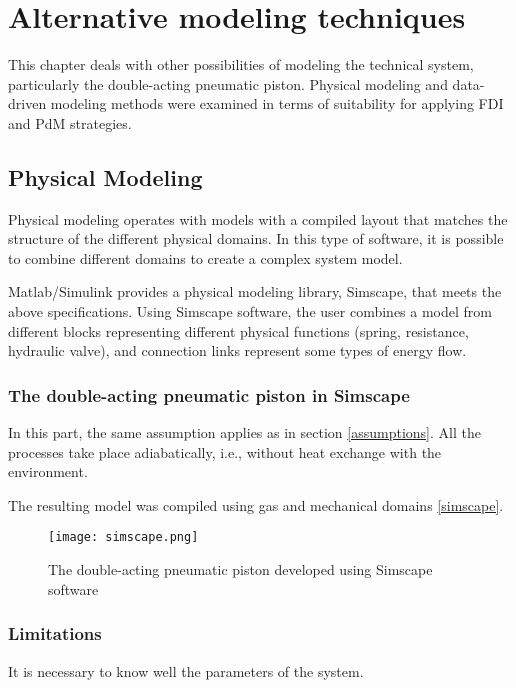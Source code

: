 \chapter{Alternative modeling techniques}

This chapter deals with other possibilities of modeling the technical
system, particularly the double-acting pneumatic piston. Physical modeling
and data-driven modeling methods were examined in terms of suitability for
applying FDI and PdM strategies.

\section{Physical Modeling}
Physical modeling operates with models with a compiled layout that matches
the structure of the different physical domains. In this type of software,
it is possible to combine different domains to create a complex system
model.

Matlab/Simulink provides a physical modeling library, Simscape, that meets
the above specifications. Using Simscape software, the user combines a
model from different blocks representing different physical functions
(spring, resistance, hydraulic valve), and connection links represent some
types of energy flow.



\subsection{The double-acting pneumatic piston in Simscape}

In this part, the same assumption applies as in section \ref{assumptions}. All the
processes take place adiabatically, i.e., without heat exchange with the
environment. 

The resulting model was compiled using gas and mechanical domains \ref{simscape}.

\begin{figure}[h!]
    \centering
    \texttt{[image: simscape.png]}
    \caption{The double-acting pneumatic piston developed using Simscape
    software}
    \label{fig:simscape}
\end{figure}


\subsection{Limitations}

It is necessary to know well the parameters of the system.

